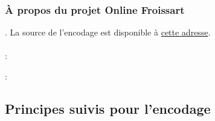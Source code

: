\documentclass[12pt, a4paper]{article}
\begin{document}
        
        \subsubsection{À propos du projet Online Froissart}
         \href{}{\textit{}}. La source de l'encodage est disponible à \href{https://www.dhi.ac.uk/onlinefroissart/browsey.jsp?f=b&pb2=Ber-3_SHF_3A-307&disp2=shf&GlobalWord=0&div2=ms.f.transc.Ber-3&div1=ms.f.transc.Bre-3&div0=ms.f.transc.Ant-3&panes=3&GlobalMode=shf&img0=&disp0=shf&disp1=shf&pb1=Bre-3_SHF_3A-307&img2=&GlobalShf=3A-306&pb0=Ant-3_SHF_3A-307&img1=}{cette adresse}.\\~\\
        \noindent  : \begin{itemize}\end{itemize} \noindent  : \begin{itemize}\end{itemize} 
                \subsection{Principes suivis pour l'encodage}
\end{document}
